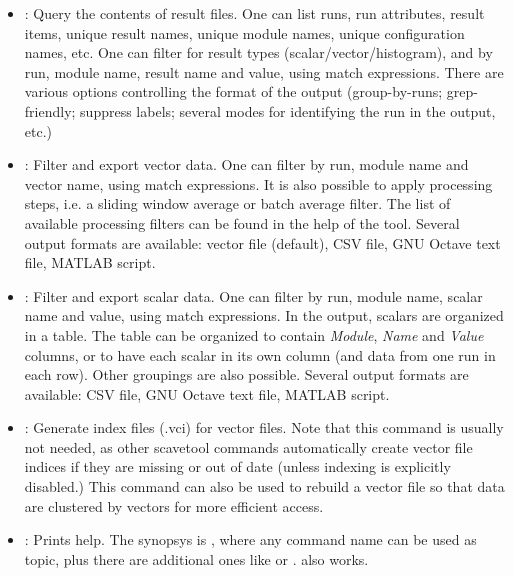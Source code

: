 \begin{itemize}

\item {}: Query the contents of result files. One can list
    runs, run attributes, result items, unique result names, unique module
    names, unique configuration names, etc. One can filter for result types
    (scalar/vector/histogram), and by run, module name, result name and value,
    using match expressions. There are various options controlling the format
    of the output (group-by-runs; grep-friendly; suppress labels; several
    modes for identifying the run in the output, etc.)

\item {}: Filter and export vector data.  One can filter by run,
    module name and vector name, using match expressions. It is also possible
    to apply processing steps, i.e. a sliding window average or batch average
    filter. The list of available processing filters can be found in the
    help of the tool. Several output formats are available: vector file
    (default), CSV file, GNU Octave text file, MATLAB script.

\item {}: Filter and export scalar data. One can filter by run,
    module name, scalar name and value, using match expressions. In the output,
    scalars are organized in a table. The table can be organized to contain
    \textit{Module}, \textit{Name} and \textit{Value} columns, or to have each
    scalar in its own column (and data from one run in each row). Other
    groupings are also possible. Several output formats are available: CSV file,
    GNU Octave text file, MATLAB script.

\item {}: Generate index files (.vci) for vector files. Note that this
    command is usually not needed, as other scavetool commands automatically create
    vector file indices if they are missing or out of date (unless indexing is
    explicitly disabled.) This command can also be used to rebuild a vector file
    so that data are clustered by vectors for more efficient access.

\item {}: Prints help. The synopsys is ,
    where any command name can be used as topic, plus there are
    additional ones like  or .  also works.

\end{itemize}

